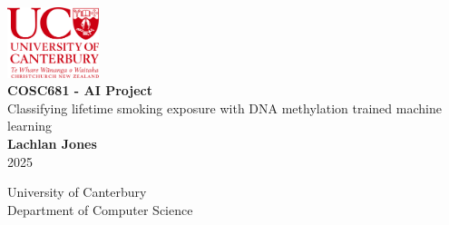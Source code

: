 \documentclass{article} %
\begin{document}
\doublespacing

\begin{titlepage}
    \centering
    \singlespacing
    \vspace*{1cm}

    \includegraphics[width=0.2\textwidth]{University_of_Canterbury_logo.svg.png}\\[1.5cm]

    \Huge
    \textbf{COSC681 - AI Project}\\[1.5cm]

    \LARGE
    Classifying lifetime smoking exposure with DNA methylation trained machine learning\\[2.5cm]

    \Large
    \textbf{Lachlan Jones}\\[0.5cm]
    2025\\[2.5cm]



    \vfill

    \Large
    University of Canterbury\\
    Department of Computer Science
\end{titlepage}

\end{document}
